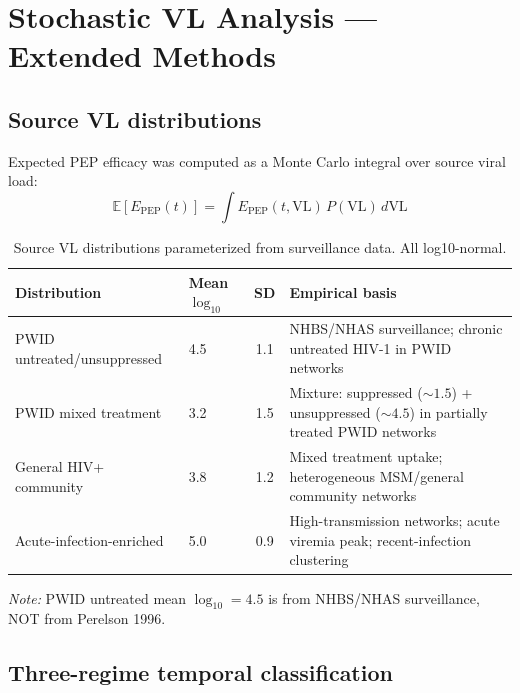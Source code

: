 \documentclass[11pt]{article}
\theoremstyle{definition}
\theoremstyle{remark}
\newcommand{\Epep}{E_{\text{PEP}}}
\begin{document}
\section{Stochastic VL Analysis --- Extended Methods}

\subsection{Source VL distributions}

Expected PEP efficacy was computed as a Monte Carlo integral over source viral load:
\begin{equation}
\mathbb{E}[\Epep(t)] = \int \Epep(t, \text{VL})\,P(\text{VL})\,d\text{VL}
\label{eq:mc_integral}
\end{equation}

\begin{table}[H]
\centering
\small
\caption{Source VL distributions parameterized from surveillance data. All log10-normal.}
\begin{tabular}{@{}llcp{6cm}@{}}
\toprule
\textbf{Distribution} & \textbf{Mean $\log_{10}$} & \textbf{SD} & \textbf{Empirical basis} \\
\midrule
PWID untreated/unsuppressed & 4.5 & 1.1 & NHBS/NHAS surveillance; chronic untreated HIV-1 in PWID networks \\
PWID mixed treatment & 3.2 & 1.5 & Mixture: suppressed ($\sim 1.5$) + unsuppressed ($\sim 4.5$) in partially treated PWID networks \\
General HIV+ community & 3.8 & 1.2 & Mixed treatment uptake; heterogeneous MSM/general community networks \\
Acute-infection-enriched & 5.0 & 0.9 & High-transmission networks; acute viremia peak; recent-infection clustering \\
\bottomrule
\end{tabular}
\end{table}

\textit{Note:} PWID untreated mean $\log_{10} = 4.5$ is from NHBS/NHAS surveillance, NOT from Perelson 1996.

\subsection{Three-regime temporal classification}
\end{document}
